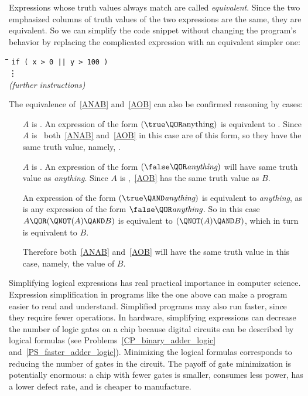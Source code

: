 Expressions whose truth values always match are called
\emph{equivalent}.  Since the two emphasized columns of truth values
of the two expressions are the same, they are equivalent.  So we can
simplify the code snippet without changing the program's behavior by
replacing the complicated expression with an equivalent simpler one:
\begin{tabbing}
\hspace{1in} \= \quad\quad \= \quad\quad \= \quad\quad \= \kill
\> \texttt{if ( x > 0 || y > 100 )} \\
\> \> \vdots\\
\> \emph{(further instructions)}
\end{tabbing}

The equivalence of~\eqref{ANAB} and~\eqref{AOB} can also be confirmed
reasoning by cases:
\begin{itemize}
\item[$A$ is \true.]  An expression of the form $(\true \QOR
  \text{anything})$ is equivalent to \true.  Since $A$ is \true\
  both~\eqref{ANAB} and~\eqref{AOB} in this case are of this form, so they
  have the same truth value, namely, \true.

\item[$A$ is \false.]  An expression of the form $(\false \QOR
  \textit{anything})$ will have same truth value as \emph{anything}.
  Since $A$ is \false,~\eqref{AOB} has the same truth value as $B$.

   An expression of the form $(\true \QAND \textit{anything})$ is
   equivalent to \emph{anything}, as is any expression of the form
   $\false \QOR \emph{anything}$.  So in this case $A \QOR (\QNOT(A)
   \QAND B)$ is equivalent to $(\QNOT(A) \QAND B)$, which in turn is
   equivalent to $B$.

   Therefore both~\eqref{ANAB} and~\eqref{AOB} will have the same truth
   value in this case, namely, the value of $B$.
\end{itemize}

Simplifying logical expressions has real practical importance in
computer science.  Expression simplification in programs like the one
above can make a program easier to read and understand. Simplified
programs may also run faster, since they require fewer operations.  In
hardware, simplifying expressions can decrease the number of logic
gates on a chip because digital circuits can be described by
logical formulas (see Problems~\ref{CP_binary_adder_logic}
and~\ref{PS_faster_adder_logic}).  Minimizing the logical formulas
corresponds to reducing the number of gates in the circuit.  The
payoff of gate minimization is potentially enormous: a chip with fewer
gates is smaller, consumes less power, has a lower defect rate, and is
cheaper to manufacture.

